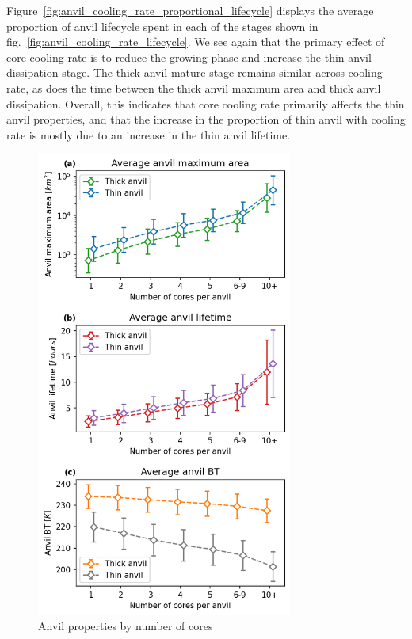 Figure~\ref{fig:anvil_cooling_rate_proportional_lifecycle} displays the average proportion of anvil lifecycle spent in each of the stages shown in fig.~\ref{fig:anvil_cooling_rate_lifecycle}.
We see again that the primary effect of core cooling rate is to reduce the growing phase and increase the thin anvil dissipation stage.
The thick anvil mature stage remains similar across cooling rate, as does the time between the thick anvil maximum area and thick anvil dissipation.
Overall, this indicates that core cooling rate primarily affects the thin anvil properties, and that the increase in the proportion of thin anvil with cooling rate  is mostly due to an increase in the thin anvil lifetime.

\begin{figure}[tp]
    \centering
    \includegraphics[width=0.75\textwidth]{figures/ch2_24.png}
    \caption{Anvil properties by number of cores}
    \label{fig:anvil_number_of_cores_properties}
\end{figure}

